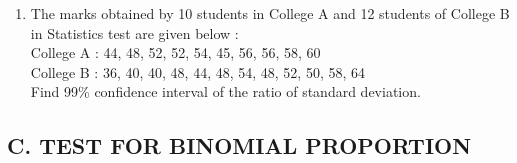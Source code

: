 \documentclass[11pt, a4paper]{article}
\begin{document}
\begin{enumerate}
\item The marks obtained by 10 students in College A and 12 students of College B in Statistics test are given below : \\

College A : 44, 48, 52, 52, 54, 45, 56, 56, 58, 60 \\

College B : 36, 40, 40, 48, 44, 48, 54, 48, 52, 50, 58, 64 \\

Find 99\% confidence interval of the ratio of standard deviation.








\end{enumerate}

















\pagebreak








\begin{center}

\section*{C. TEST FOR BINOMIAL PROPORTION}

\end{center}
\end{document}
